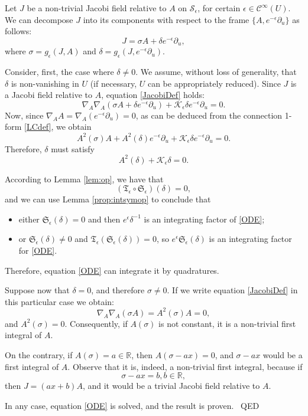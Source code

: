 \documentclass[10pt,a4paper]{amsart}
\newenvironment{proof}{{\sc Proof:}}{~\hfill QED}
\begin{document}
\begin{proof}
Let $J$ be a non-trivial Jacobi field relative to $A$ on $\mathcal{S}_{\epsilon}$, for certain $\epsilon\in \mathcal{C}^{\infty}(U)$. We can decompose $J$ into its components with respect to the frame $\{A,e^{-\epsilon}\partial_u\}$ as follows:
$$
J=\sigma A+\delta e^{-\epsilon}\partial_u,
$$
where $\sigma=g_{\epsilon}(J,A)$ and $\delta=g_{\epsilon}(J, e^{-\epsilon}\partial_u)$. 

Consider, first, the case where $\delta\neq 0$. We assume, without loss of generality, that $\delta$ is non-vanishing in $U$ (if necessary, $U$ can be appropriately reduced). Since $J$ is a Jacobi field relative to $A$, equation \eqref{JacobiDef} holds:
\begin{equation}
    \nabla_{A} \nabla_{A}\left( \sigma A+\delta e^{-\epsilon}\partial_u\right)+\mathcal{K}_{\epsilon} \delta e^{-\epsilon}\partial_u=0.
\end{equation}
Now, since $\nabla_{A} A=\nabla_{A}\left(  e^{-\epsilon}\partial_u\right)=0$, as can be deduced from the connection 1-form \eqref{LCdef}, we obtain 
\begin{equation}
    A^2(\sigma) A+A^2(\delta) e^{-\epsilon}\partial_u+ \mathcal{K}_{\epsilon} \delta e^{-\epsilon}\partial_u=0.
\end{equation}
Therefore, $\delta$ must satisfy
\begin{equation}\label{eq:JacDelta}
A^2(\delta)+\mathcal{K}_{\epsilon} \delta=0.
\end{equation}

According to Lemma \ref{lem:op}, we have that
$$
\left(\mathfrak{T}_{\epsilon}\circ \mathfrak{S}_{\epsilon} \right)(\delta)=0,
$$
and we can use Lemma \ref{prop:intsymop} to conclude that
\begin{itemize}
    \item either $\mathfrak{S}_{\epsilon}(\delta)=0$ and then $e^{\epsilon} \delta^{-1}$ is an integrating factor of \eqref{ODE};
    \item or $\mathfrak{S}_{\epsilon}(\delta)\neq 0$ and $\mathfrak{T}_{\epsilon}(\mathfrak{S}_{\epsilon}(\delta))=0$, so $e^{\epsilon} \mathfrak{S}_{\epsilon}(\delta)$ is an integrating factor for \eqref{ODE}.
\end{itemize}
Therefore, equation \eqref{ODE} can integrate it by quadratures.

Suppose now that $\delta=0$, and therefore $\sigma\neq 0$. If we write equation \eqref{JacobiDef} in this particular case we obtain:
\begin{equation}
    \nabla_{A} \nabla_{A}\left( \sigma A\right)=A^2(\sigma)A=0,
\end{equation}
and $A^2(\sigma)=0$. Consequently, if $A(\sigma)$ is not constant, it is a non-trivial first integral of $A$. 

On the contrary, if $A(\sigma)= a\in \mathbb R$, then $A(\sigma-ax)=0$, and $\sigma-ax$ would be a first integral of $A$. Observe that it is, indeed, a non-trivial first integral, because if 
$$
\sigma-ax=b, b\in\mathbb R,
$$
then $J=(ax+b)A$, and it would be a trivial Jacobi field relative to $A$.

In any case, equation \eqref{ODE} is solved, and the result is proven.
\end{proof}
\end{document}
